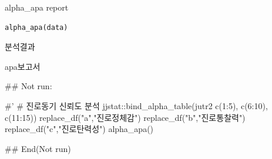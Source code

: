 \documentclass[a4paper]{book}
\begin{document}
%
\begin{Description}
alpha\_apa report
\end{Description}
%
\begin{Usage}
\begin{verbatim}
alpha_apa(data)
\end{verbatim}
\end{Usage}
%
\begin{Arguments}
\begin{ldescription}
\item[\code{data}] 분석결과
\end{ldescription}
\end{Arguments}
%
\begin{Value}
apa보고서
\end{Value}
%
\begin{Examples}
\begin{ExampleCode}
\#\# Not run: 

#'
# 진로동기 신뢰도 분석
jjstat::bind_alpha_table(jutr2%
                         c(1:5), c(6:10), c(11:15)) %
  replace_df("a","진로정체감") %
  replace_df("b","진로통찰력") %
  replace_df("c","진로탄력성") %
  alpha_apa()


## End(Not run)
\end{ExampleCode}
\end{Examples}
\end{document}
